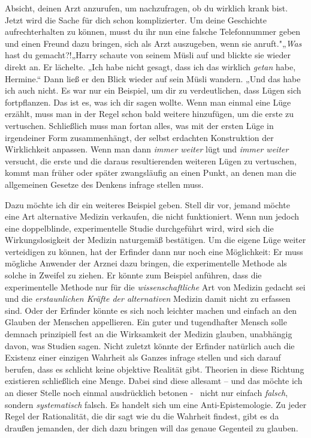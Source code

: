 {Absicht, deinen Arzt anzurufen, um nachzufragen, ob du wirklich krank bist. Jetzt wird die Sache für dich schon komplizierter. Um deine Geschichte aufrechterhalten zu können, musst du ihr nun eine falsche Telefonnummer geben und einen Freund dazu bringen, sich als Arzt auszugeben, wenn sie anruft."„\emph{Was} hast du gemacht?!„Harry schaute von seinem Müsli auf und blickte sie wieder direkt an. Er lächelte. „Ich habe nicht gesagt, dass ich das wirklich \emph{getan} habe, Hermine.“ Dann ließ er den Blick wieder auf sein Müsli wandern. „Und das habe ich auch nicht. Es war nur ein Beispiel, um dir zu verdeutlichen, dass Lügen sich fortpflanzen. Das ist es, was ich dir sagen wollte. Wenn man einmal eine Lüge erzählt, muss man in der Regel schon bald weitere hinzufügen, um die erste zu vertuschen. Schließlich muss man fortan alles, was mit der ersten Lüge in irgendeiner Form zusammenhängt, der selbst erdachten Konstruktion der Wirklichkeit anpassen. Wenn man dann \emph{immer weiter} lügt und \emph{immer weiter} versucht, die erste und die daraus resultierenden weiteren Lügen zu vertuschen, kommt man früher oder später zwangsläufig an einen Punkt, an denen man die allgemeinen Gesetze des Denkens infrage stellen muss.

Dazu möchte ich dir ein weiteres Beispiel geben. Stell dir vor, jemand möchte eine Art alternative Medizin verkaufen, die nicht funktioniert. Wenn nun jedoch eine doppelblinde, experimentelle Studie durchgeführt wird, wird sich die Wirkungslosigkeit der Medizin naturgemäß bestätigen. Um die eigene Lüge weiter verteidigen zu können, hat der Erfinder dann nur noch eine Möglichkeit: Er muss mögliche Anwender der Arznei dazu bringen, die experimentelle Methode als solche in Zweifel zu ziehen. Er könnte zum Beispiel anführen, dass die experimentelle Methode nur für die \emph{wissenschaftliche} Art von Medizin gedacht sei und die \emph{erstaunlichen Kräfte der alternativen} Medizin damit nicht zu erfassen sind. Oder der Erfinder könnte es sich noch leichter machen und einfach an den Glauben der Menschen appellieren. Ein guter und tugendhafter Mensch solle demnach prinzipiell fest an die Wirksamkeit der Medizin glauben, unabhängig davon, was Studien sagen. Nicht zuletzt könnte der Erfinder natürlich auch die Existenz einer einzigen Wahrheit als Ganzes infrage stellen und sich darauf berufen, dass es schlicht keine objektive Realität gibt. Theorien in diese Richtung existieren schließlich eine Menge. Dabei sind diese allesamt -- und das möchte ich an dieser Stelle noch einmal ausdrücklich betonen - ~nicht nur einfach \emph{falsch}, sondern \emph{systematisch} falsch. Es handelt sich um eine Anti-Epistemologie. Zu jeder Regel der Rationalität, die dir sagt wie du die Wahrheit findest, gibt es da draußen jemanden, der dich dazu bringen will das genaue Gegenteil zu glauben.

}

